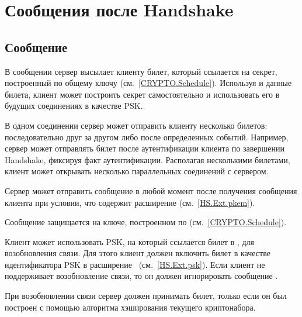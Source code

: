 \section{Сообщения после Handshake}\label{HS.Post} 
        
\subsection{Сообщение }\label{HS.NST} 

В сообщении  сервер высылает клиенту билет, который
ссылается на секрет, построенный по общему ключу 
 (см.~\ref{CRYPTO.Schedule}).
%
Используя  и данные билета, клиент может 
построить секрет самостоятельно и использовать его в будущих соединениях в 
качестве PSK.

В одном соединении сервер может отправить клиенту несколько билетов:
последовательно друг за другом либо после определенных событий.
%
Например, сервер может отправлять билет после аутентификации клиента по 
завершении Handshake, фиксируя факт аутентификации. 
%
Располагая несколькими билетами, клиент может открывать несколько параллельных 
соединений с сервером.

Сервер может отправить сообщение  в любой момент после 
получения сообщения  клиента при условии, что 
 содержит расширение 
 (см.~\ref{HS.Ext.pkem}).


Сообщение  защищается на ключе, построенном по 
 (см.~\ref{CRYPTO.Schedule}). 

Клиент может использовать PSK, на который ссылается билет в 
, для возобновления связи. Для этого клиент должен 
включить билет в качестве идентификатора PSK в 
расширение~ (см.~\ref{HS.Ext.psk}).
%
Если клиент не поддерживает возобновление связи, то он должен игнорировать 
сообщение .


При возобновлении связи сервер должен принимать билет, только если он был 
построен с помощью алгоритма хэширования текущего криптонабора.

